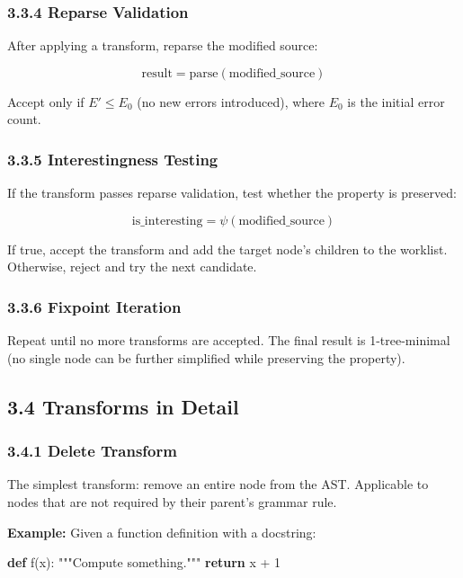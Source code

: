 \documentclass[
  letterpaper,
]{article}
\newenvironment{Shaded}{\begin{snugshade}}{\end{snugshade}}
\newcommand{\CommentTok}[1]{\textcolor[rgb]{0.37,0.37,0.37}{#1}}
\newcommand{\ControlFlowTok}[1]{\textcolor[rgb]{0.00,0.23,0.31}{\textbf{#1}}}
\newcommand{\DecValTok}[1]{\textcolor[rgb]{0.68,0.00,0.00}{#1}}
\newcommand{\KeywordTok}[1]{\textcolor[rgb]{0.00,0.23,0.31}{\textbf{#1}}}
\newcommand{\NormalTok}[1]{\textcolor[rgb]{0.00,0.23,0.31}{#1}}
\newcommand{\OperatorTok}[1]{\textcolor[rgb]{0.37,0.37,0.37}{#1}}
\begin{document}
\subsubsection{3.3.4 Reparse Validation}\label{reparse-validation}

After applying a transform, reparse the modified source:

\[
\text{result} = \text{parse}(\text{modified\_source})
\]

Accept only if \(E' \leq E_0\) (no new errors introduced), where \(E_0\)
is the initial error count.

\subsubsection{3.3.5 Interestingness
Testing}\label{interestingness-testing}

If the transform passes reparse validation, test whether the property is
preserved:

\[
\text{is\_interesting} = \psi(\text{modified\_source})
\]

If true, accept the transform and add the target node's children to the
worklist. Otherwise, reject and try the next candidate.

\subsubsection{3.3.6 Fixpoint Iteration}\label{fixpoint-iteration}

Repeat until no more transforms are accepted. The final result is
1-tree-minimal (no single node can be further simplified while
preserving the property).

\subsection{3.4 Transforms in Detail}\label{transforms-in-detail}

\subsubsection{3.4.1 Delete Transform}\label{delete-transform}

The simplest transform: remove an entire node from the AST. Applicable
to nodes that are not required by their parent's grammar rule.

\textbf{Example:} Given a function definition with a docstring:

\begin{Shaded}
\begin{Highlighting}[]
\KeywordTok{def}\NormalTok{ f(x):}
    \CommentTok{"""Compute something."""}
    \ControlFlowTok{return}\NormalTok{ x }\OperatorTok{+} \DecValTok{1}
\end{Highlighting}
\end{Shaded}
\end{document}
